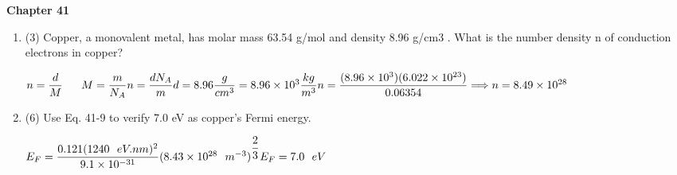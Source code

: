 \documentclass[fleqn]{article}
\begin{document}
  \textbf{Chapter 41}
  \begin{enumerate}
    \item (3) Copper, a monovalent metal, has molar mass 63.54 g/mol and density 8.96 g/cm3
    . What is the number density n of conduction electrons in copper?

    \textcolor{hwColor}{
      $
        n=\dfrac{d}{M} ~~~~~ M=\dfrac{m}{N_A} \\
        \\
        n=\dfrac{d N_A}{m} \\
        \\
        d=8.96 \dfrac{g}{cm^3}=8.96 \times 10^3 \dfrac{kg}{m^3} \\
        \\
        n=\dfrac{(8.96 \times 10^3)(6.022 \times 10^{23})}{0.06354} \Longrightarrow n=8.49 \times 10^{28}
      $ 
    }


    \item (6) Use Eq. 41-9 to verify 7.0 eV as copper’s Fermi energy.

    \textcolor{hwColor}{
      $
        E_F=\dfrac{0.121(1240 ~~ eV.nm)^2}{9.1 \times 10^{-31}} (8.43 \times 10^{28} ~~ m^{-3})^{\dfrac{2}{3}} \\
        \\
        E_F=7.0 ~~ eV
      $ 
    }
    
  \end{enumerate}
\end{document}
